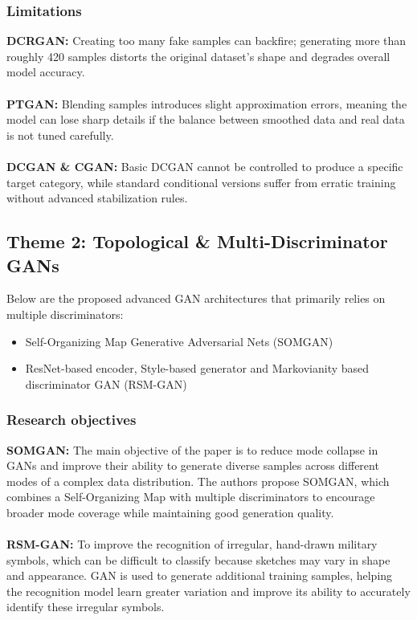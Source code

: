 \documentclass[12pt,a4paper]{article}
\begin{document}
\subsubsection{Limitations}
\textbf{DCRGAN:} Creating too many fake samples can backfire; generating more than roughly 420 samples distorts the original dataset’s shape and degrades overall model accuracy. \\
\\ \textbf{PTGAN:} Blending samples introduces slight approximation errors, meaning the model can lose sharp details if the balance between smoothed data and real data is not tuned carefully. \\
\\ \textbf{DCGAN \& CGAN:} Basic DCGAN cannot be controlled to produce a specific target category, while standard conditional versions suffer from erratic training without advanced stabilization rules.

\subsection{Theme 2: Topological \& Multi-Discriminator GANs}
Below are the proposed advanced GAN architectures that primarily relies on multiple discriminators:

\begin{itemize}
    \item Self-Organizing Map Generative Adversarial Nets (SOMGAN)
    \item ResNet-based encoder, Style-based generator and Markovianity based discriminator GAN (RSM-GAN)
\end{itemize}

\subsubsection{Research objectives}
\textbf{SOMGAN:} The main objective of the paper is to reduce mode collapse in GANs and improve their ability to generate diverse samples across different modes of a complex data distribution. The authors propose SOMGAN, which combines a Self-Organizing Map with multiple discriminators to encourage broader mode coverage while maintaining good generation quality. \\
\\ \textbf{RSM-GAN:} To improve the recognition of irregular, hand-drawn military symbols, which can be difficult to classify because sketches may vary in shape and appearance. GAN is used to generate additional training samples, helping the recognition model learn greater variation and improve its ability to accurately identify these irregular symbols.
\end{document}
